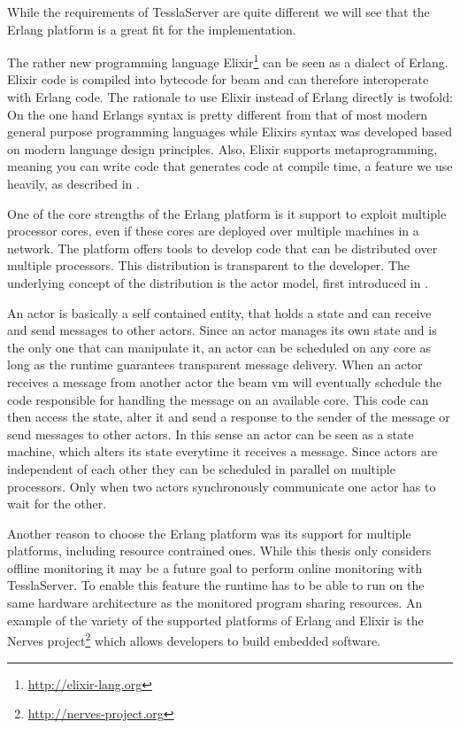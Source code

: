 While the requirements of TesslaServer are quite different we will see that the Erlang platform is a great fit for the implementation.

The rather new programming language Elixir\footnote{\url{http://elixir-lang.org}} can be seen as a dialect of Erlang.
Elixir code is compiled into bytecode for \gls{beam} and can therefore interoperate with Erlang code.
The rationale to use Elixir instead of Erlang directly is twofold:
On the one hand Erlangs syntax is pretty different from that of most modern general purpose programming languages while Elixirs syntax was developed based on modern language design principles.
Also, Elixir supports metaprogramming, meaning you can write code that generates code at compile time, a feature we use heavily, as described in .

One of the core strengths of the Erlang platform is it support to exploit multiple processor cores, even if these cores are deployed over multiple machines in a network.
The platform offers tools to develop code that can be distributed over multiple processors.
This distribution is transparent to the developer.
The underlying concept of the distribution is the actor model, first introduced in \cite{Hewitt1973}.

An actor is basically a self contained entity, that holds a state and can receive and send messages to other actors.
Since an actor manages its own state and is the only one that can manipulate it, an actor can be scheduled on any core as long as the runtime guarantees transparent message delivery.
When an actor receives a message from another actor the \gls{beam} \gls{vm} will eventually schedule the code responsible for handling the message on an available core.
This code can then access the state, alter it and send a response to the sender of the message or send messages to other actors.
In this sense an actor can be seen as a state machine, which alters its state everytime it receives a message.
Since actors are independent of each other they can be scheduled in parallel on multiple processors.
Only when two actors synchronously communicate one actor has to wait for the other.

Another reason to choose the Erlang platform was its support for multiple platforms, including resource contrained ones.
While this thesis only considers offline monitoring it may be a future goal to perform online monitoring with TesslaServer.
To enable this feature the runtime has to be able to run on the same hardware architecture as the monitored program sharing resources.
An example of the variety of the supported platforms of Erlang and Elixir is the Nerves project\footnote{\url{http://nerves-project.org}} which allows developers to build embedded software.

